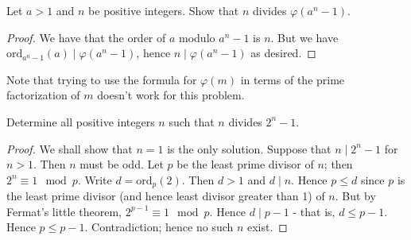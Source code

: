 \begin{prb}
Let $a > 1$ and $n$ be positive integers.  Show that $n$ divides
$\varphi(a^n - 1)$.
\end{prb}
\begin{proof}
We have that the order of $a$ modulo $a^n-1$ is $n$.  But we have
$\text{ord}_{a^n-1}(a) \mid \varphi(a^n-1)$, hence $n \mid
\varphi(a^n-1)$ as desired.
\end{proof}
Note that trying to use the formula for $\varphi(m)$ in terms of the prime factorization of $m$ doesn't work for this problem.
\begin{prb}
Determine all positive integers $n$ such that $n$ divides $2^n-1$.
\begin{proof}
We shall show that $n = 1$ is the only solution.  Suppose that $n\mid 2^n-1$ for $n > 1$.  Then $n$ must be odd.  Let $p$ be the least prime divisor of $n$; then $2^n \equiv 1\mod{p}$.  Write $d = \text{ord}_p(2)$.  Then $d > 1$ and $d \mid n$.  Hence $p \le d$ since $p$ is the least prime divisor (and hence least divisor greater than 1) of $n$.  But by Fermat's little theorem, $2^{p-1} \equiv 1\mod{p}$.  Hence $d \mid p-1$ - that is, $d \le p-1$.  Hence $p \le p-1$.  Contradiction; hence no such $n$ exist.
\end{proof}
\end{prb}
